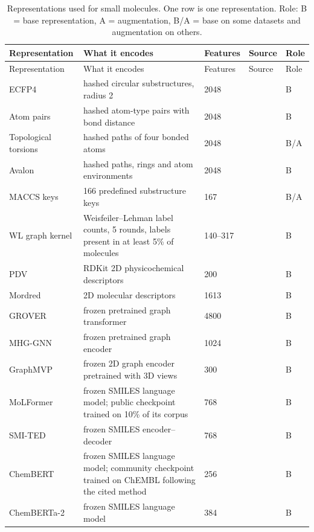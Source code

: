 \begin{longtable}{p{3.2cm}p{5.6cm}p{1.6cm}p{1.6cm}p{1.4cm}}
\caption{Representations used for small molecules. One row is one representation. Role: B = base representation, A = augmentation, B/A = base on some datasets and augmentation on others.}\label{tab:reps_smallmol}\\
\toprule
Representation & What it encodes & Features & Source & Role \\
\midrule
\endfirsthead
\toprule
Representation & What it encodes & Features & Source & Role \\
\midrule
\endhead
\bottomrule
\endfoot
ECFP4 & hashed circular substructures, radius 2 & 2048 & \citep{rogers2010} & B \\
Atom pairs & hashed atom-type pairs with bond distance & 2048 & \citep{Carhart1985} & B \\
Topological torsions & hashed paths of four bonded atoms & 2048 & \citep{Nilakantan1987} & B/A \\
Avalon & hashed paths, rings and atom environments & 2048 & \citep{Gedeck2006} & B \\
MACCS keys & 166 predefined substructure keys & 167 & \citep{Durant2002} & B/A \\
WL graph kernel & Weisfeiler--Lehman label counts, 5 rounds, labels present in at least 5\% of molecules & 140--317 & \citep{Shervashidze2011} & B \\
PDV & RDKit 2D physicochemical descriptors & 200 & \citep{rdkit} & B \\
Mordred & 2D molecular descriptors & 1613 & \citep{Moriwaki2018} & B \\
GROVER & frozen pretrained graph transformer & 4800 & \citep{Rong2020GROVER} & B \\
MHG-GNN & frozen pretrained graph encoder & 1024 & \citep{kishimoto2023} & B \\
GraphMVP & frozen 2D graph encoder pretrained with 3D views & 300 & \citep{Liu2022GraphMVP} & B \\
MoLFormer & frozen SMILES language model; public checkpoint trained on 10\% of its corpus & 768 & \citep{ross2022} & B \\
SMI-TED & frozen SMILES encoder--decoder & 768 & \citep{Soares2025} & B \\
ChemBERT & frozen SMILES language model; community checkpoint trained on ChEMBL following the cited method & 256 & \citep{Zhang2022ChemBERT} & B \\
ChemBERTa-2 & frozen SMILES language model & 384 & \citep{Ahmad2022} & B \\

\end{longtable}
